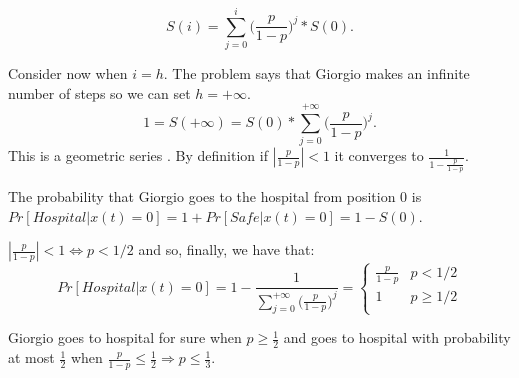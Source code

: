 \documentclass[paper=a4, fontsize=11pt]{scrartcl} %
\numberwithin{equation}{section} %
\numberwithin{figure}{section} %
\numberwithin{table}{section} %
\begin{document}
\[
S(i) = \sum_{j=0}^{i} \Big(\frac{p}{1-p}\Big)^j*S(0).
\]

Consider now when $i = h$. The problem says that Giorgio makes an infinite number of steps so we can set $h = +\infty$.
\[
1 = S(+\infty) = S(0)*\sum_{j=0}^{+\infty} \Big(\frac{p}{1-p}\Big)^j.
\]
This is a geometric series \cite{geo}. By definition if $|\frac{p}{1-p}| < 1$ it converges to $\frac{1}{1-\frac{p}{1-p}}$.

The probability that Giorgio goes to the hospital from position 0 is $Pr[Hospital|x(t)=0] = 1 + Pr[Safe|x(t)=0] = 1 - S(0)$.

$|\frac{p}{1-p}| < 1 \Leftrightarrow p < 1/2$ and so, finally, we have that:
\[
Pr[Hospital|x(t)=0] = 1 - \frac{1}{\sum_{j=0}^{+\infty} \big(\frac{p}{1-p}\big)^j} = \begin{cases}
\frac{p}{1-p} & p < 1/2 \\
1 & p \geq 1/2 \\
\end{cases}
\]

Giorgio goes to hospital for sure when $p \geq \frac{1}{2}$ and goes to hospital with probability at most $\frac{1}{2}$ when $\frac{p}{1-p} \leq \frac{1}{2} \Rightarrow p \leq \frac{1}{3}$.


\vfill
 

\end{document}
